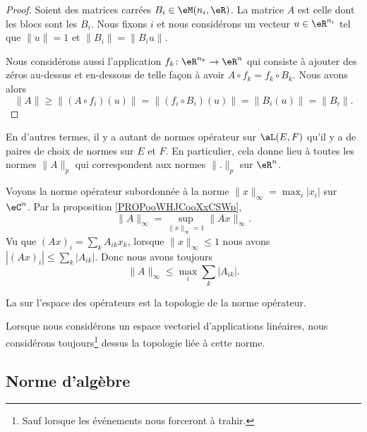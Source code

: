 \begin{proof}
	Soient des matrices carrées \( B_i\in \eM(n_i,\eR)\). La matrice \( A\) est celle dont les blocs sont les \( B_i\). Nous fixons \( i\) et nous considérons un vecteur \( u\in \eR^{n_i}\) tel que \( \| u \|=1\) et \( \| B_i \|=\| B_iu \|\).

	Nous considérons aussi l'application \(f_k \colon \eR^{n_k}\to \eR^n  \) qui consiste à ajouter des zéros au-dessus et en-dessous de telle façon à avoir \( A\circ f_k=f_k\circ B_k\). Nous avons alors
	\begin{equation}
		\| A \|\geq \| (A\circ f_i)(u) \|=\| (f_i\circ B_i)(u) \|=\| B_i(u) \|=\| B_i \|.
	\end{equation}
\end{proof}

En d'autres termes, il y a autant de normes opérateur sur \( \aL(E,F)\) qu'il y a de paires de choix de normes sur \( E\) et \( F\). En particulier, cela donne lieu à toutes les normes \( \| A \|_p\) qui correspondent aux normes \( \| . \|_p\) sur \( \eR^n\).

\begin{example}     \label{EXooXPXAooYyBwMX}
	Voyons la norme opérateur subordonnée à la norme \( \| x \|_{\infty}=\max_i| x_i |\) sur \( \eC^n\). Par la proposition \ref{PROPooWHJCooXxCSWp},
	\begin{equation}
		\| A \|_{\infty}=\sup_{\| x \|_{\infty}=1}\| Ax \|_{\infty}.
	\end{equation}
	Vu que \( (Ax)_i=\sum_kA_{ik}x_k\), lorsque \( \| x \|_{\infty}\leq 1\) nous avons \( | (Ax)_i |\leq \sum_k| A_{ik} |\). Donc nous avons toujours
	\begin{equation}        \label{EQooPLCIooVghasD}
		\| A \|_{\infty}\leq \max_i\sum_{k}| A_{ik} |.
	\end{equation}
\end{example}

\begin{definition}
	La  sur l'espace des opérateurs est la topologie de la norme opérateur.
\end{definition}
Lorsque nous considérons un espace vectoriel d'applications linéaires, nous considérons toujours\footnote{Sauf lorsque les événements nous forceront à trahir.} dessus la topologie liée à cette norme.

\subsection{Norme d'algèbre}

